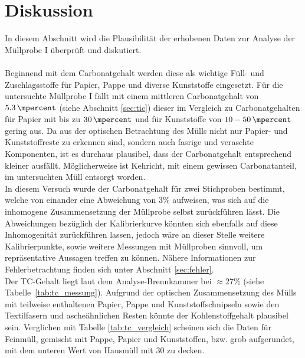 \chapter{Diskussion}
\label{sec:diskussion}

In diesem Abschnitt wird die Plausibilität der erhobenen Daten zur Analyse der Müllprobe I überprüft und diskutiert.\\ \\
Beginnend mit dem Carbonatgehalt werden diese als wichtige Füll- und Zuschlagsstoffe für Papier, Pappe und diverse Kunststoffe eingesetzt. Für die untersuchte Müllprobe I fällt mit einem mittleren Carbonatgehalt von $\SI{5,3}{\mpercent}$ (siehe Abschnitt \ref{sec:tic}) dieser im Vergleich zu Carbonatgehalten für Papier mit bis zu $\SI{30}{\mpercent}$ \cite{Wikipedia.21.11.2019} und für Kunststoffe von $10 - \SI{50}{\mpercent}$ \cite{PolymerServiceGmbHMerseburg.13.08.2019} gering aus. Da aus der optischen Betrachtung des Mülls nicht nur Papier- und Kunststoffreste zu erkennen sind, sondern auch fasrige und veraschte Komponenten, ist es durchaus plausibel, dass der Carbonatgehalt entsprechend kleiner ausfällt. Möglicherweise ist Kehricht, mit einem gewissen Carbonatanteil, im untersuchten Müll entsorgt worden.\\
In diesem Versuch wurde der Carbonatgehalt für zwei Stichproben bestimmt, welche von einander eine Abweichung von 3\% aufweisen, was sich auf die inhomogene Zusammensetzung der Müllprobe selbst zurückführen lässt.\linebreak
Die Abweichungen bezüglich der Kalibrierkurve könnten sich ebenfalls auf diese Inhomogenität zurückführen lassen, jedoch wäre an dieser Stelle weitere Kalibrierpunkte, sowie weitere Messungen mit Müllproben sinnvoll, um repräsentative Aussagen treffen zu können. Nähere Informationen zur Fehlerbetrachtung finden sich unter Abschnitt \ref{sec:fehler}.\\
Der TC-Gehalt liegt laut dem Analyse-Brennkammer bei $\approx 27\%$ (siehe \mbox{Tabelle \ref{tab:tc_messung}}). Aufgrund der optischen Zusammensetzung des Mülls mit teilweise enthaltenen Papier, Pappe und Kunststoffschnipseln sowie den Textilfasern und ascheähnlichen Resten könnte der Kohlenstoffgehalt plausibel sein. Verglichen mit Tabelle \ref{tab:tc_vergleich} \mbox{\cite[S.11]{HansGunterRamke.}} scheinen sich die Daten für Feinmüll, gemischt mit Pappe, Papier und Kunststoffen, bzw. grob aufgerundet, mit dem unteren Wert von Hausmüll mit \SI{30}{\mpercent} zu decken.\\
